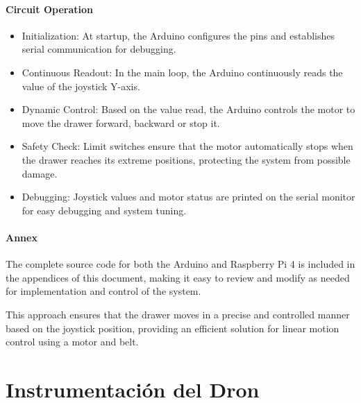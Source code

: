     
    \paragraph{\textbf{Circuit Operation}
    }
    \begin{itemize}
        \item Initialization: At startup, the Arduino configures the pins and establishes serial communication for debugging.
    \item Continuous Readout: In the main loop, the Arduino continuously reads the value of the joystick Y-axis.
    \item Dynamic Control: Based on the value read, the Arduino controls the motor to move the drawer forward, backward or stop it.
    \item Safety Check: Limit switches ensure that the motor automatically stops when the drawer reaches its extreme positions, protecting the system from possible damage.
    \item Debugging: Joystick values and motor status are printed on the serial monitor for easy debugging and system tuning.
    \end{itemize}
    
    \paragraph{\textbf{Annex}
    }
    The complete source code for both the Arduino and Raspberry Pi 4 is included in the appendices of this document, making it easy to review and modify as needed for implementation and control of the system.
    
    This approach ensures that the drawer moves in a precise and controlled manner based on the joystick position, providing an efficient solution for linear motion control using a motor and belt.

    


\section{Instrumentación del Dron}


